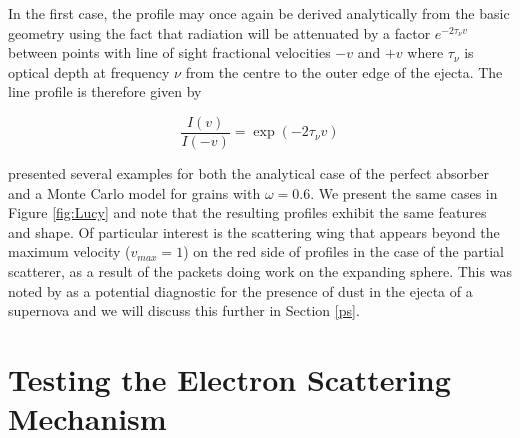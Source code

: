 In the first case, the profile may once again be derived analytically from 
the basic geometry using the fact that radiation will be attenuated by a 
factor $e^{-2\tau_{\nu} v}$ between points with line of sight fractional velocities $-v$ and 
$+v$ where $\tau_{\nu}$ is optical depth at frequency $\nu$ from the centre to the outer edge of the ejecta.  The line profile is therefore given by

\begin{equation}
\frac{I(v)}{I(-v)} = \exp(-2\tau_{\nu} v)  
\end{equation}

\citet{Lucy1989} presented several examples for both the analytical case of 
the perfect absorber and a Monte Carlo model for grains with $\omega 
=0.6$.  We present the same cases in Figure \ref{fig:Lucy} and note that 
the resulting profiles exhibit the same features and shape. Of particular 
interest is the scattering wing that appears beyond the maximum velocity 
($v_{max}=1$) on the red side of profiles in the case of the partial 
scatterer, as a result of the packets doing work on the expanding sphere.  
This was noted by \citet{Lucy1989} as a potential diagnostic for the 
presence of dust in the ejecta of a supernova and we will discuss this 
further in Section \ref{ps}.

\section{Testing the Electron Scattering Mechanism}


